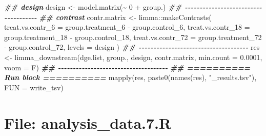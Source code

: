 \documentclass[
]{article}
\newenvironment{Shaded}{\begin{snugshade}}{\end{snugshade}}
\newcommand{\AttributeTok}[1]{\textcolor[rgb]{0.77,0.63,0.00}{#1}}
\newcommand{\DecValTok}[1]{\textcolor[rgb]{0.00,0.00,0.81}{#1}}
\newcommand{\DocumentationTok}[1]{\textcolor[rgb]{0.56,0.35,0.01}{\textbf{\textit{#1}}}}
\newcommand{\FloatTok}[1]{\textcolor[rgb]{0.00,0.00,0.81}{#1}}
\newcommand{\FunctionTok}[1]{\textcolor[rgb]{0.00,0.00,0.00}{#1}}
\newcommand{\NormalTok}[1]{#1}
\newcommand{\OtherTok}[1]{\textcolor[rgb]{0.56,0.35,0.01}{#1}}
\newcommand{\SpecialCharTok}[1]{\textcolor[rgb]{0.00,0.00,0.00}{#1}}
\newcommand{\StringTok}[1]{\textcolor[rgb]{0.31,0.60,0.02}{#1}}
\begin{document}
\begin{Shaded}
\begin{Highlighting}[]
\DocumentationTok{\#\# design}
\NormalTok{design }\OtherTok{\textless{}{-}} \FunctionTok{model.matrix}\NormalTok{(}\SpecialCharTok{\textasciitilde{}} \DecValTok{0} \SpecialCharTok{+}\NormalTok{ group.)}
\DocumentationTok{\#\# {-}{-}{-}{-}{-}{-}{-}{-}{-}{-}{-}{-}{-}{-}{-}{-}{-}{-}{-}{-}{-}{-}{-}{-}{-}{-}{-}{-}{-}{-}{-}{-}{-}{-}{-}{-}{-} }
\DocumentationTok{\#\# contrast}
\NormalTok{contr.matrix }\OtherTok{\textless{}{-}}\NormalTok{ limma}\SpecialCharTok{::}\FunctionTok{makeContrasts}\NormalTok{(}
  \AttributeTok{treat.vs.contr\_6 =}\NormalTok{ group.treatment\_6 }\SpecialCharTok{{-}}\NormalTok{ group.control\_6,}
  \AttributeTok{treat.vs.contr\_18 =}\NormalTok{ group.treatment\_18 }\SpecialCharTok{{-}}\NormalTok{ group.control\_18, }
  \AttributeTok{treat.vs.contr\_72 =}\NormalTok{ group.treatment\_72 }\SpecialCharTok{{-}}\NormalTok{ group.control\_72, }
  \AttributeTok{levels =}\NormalTok{ design}
\NormalTok{)}
\DocumentationTok{\#\# {-}{-}{-}{-}{-}{-}{-}{-}{-}{-}{-}{-}{-}{-}{-}{-}{-}{-}{-}{-}{-}{-}{-}{-}{-}{-}{-}{-}{-}{-}{-}{-}{-}{-}{-}{-}{-} }
\NormalTok{res }\OtherTok{\textless{}{-}} \FunctionTok{limma\_downstream}\NormalTok{(dge.list, group., design, contr.matrix,}
                        \AttributeTok{min.count =} \FloatTok{0.0001}\NormalTok{, }\AttributeTok{voom =}\NormalTok{ F)}
\DocumentationTok{\#\# {-}{-}{-}{-}{-}{-}{-}{-}{-}{-}{-}{-}{-}{-}{-}{-}{-}{-}{-}{-}{-}{-}{-}{-}{-}{-}{-}{-}{-}{-}{-}{-}{-}{-}{-}{-}{-} }
\DocumentationTok{\#\# ========== Run block ========== }
\FunctionTok{mapply}\NormalTok{(res, }\FunctionTok{paste0}\NormalTok{(}\FunctionTok{names}\NormalTok{(res), }\StringTok{"\_results.tsv"}\NormalTok{), }\AttributeTok{FUN =}\NormalTok{ write\_tsv)}
\end{Highlighting}
\end{Shaded}

\hypertarget{file-analysis_data.7.r}{%
\section{File: analysis\_data.7.R}\label{file-analysis_data.7.r}}
\end{document}
